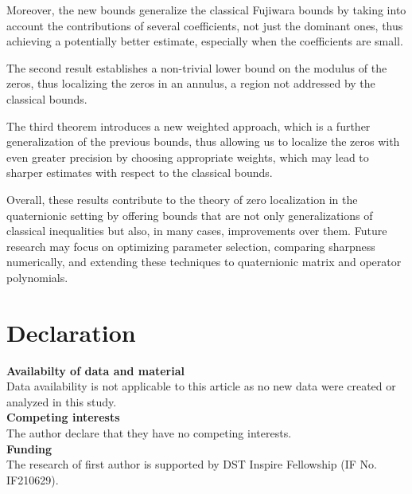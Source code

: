 \documentclass [12pt]{article}
\begin{document}
Moreover, the new bounds generalize the classical Fujiwara bounds by taking into account the contributions of several coefficients, not just the dominant ones, thus achieving a potentially better estimate, especially when the coefficients are small.

The second result establishes a non-trivial lower bound on the modulus of the zeros, thus localizing the zeros in an annulus, a region not addressed by the classical bounds.

The third theorem introduces a new weighted approach, which is a further generalization of the previous bounds, thus allowing us to localize the zeros with even greater precision by choosing appropriate weights, which may lead to sharper estimates with respect to the classical bounds.

Overall, these results contribute to the theory of zero localization in the quaternionic setting by offering bounds that are not only generalizations of classical inequalities but also, in many cases, improvements over them. Future research may focus on optimizing parameter selection, comparing sharpness numerically, and extending these techniques to quaternionic matrix and operator polynomials.
\section{Declaration}
\textbf{Availabilty of data and material}\\
 Data availability is not applicable to this article as no new data were created or analyzed in this study.\\

\noindent \textbf{Competing interests}\\
The author declare that they have no competing interests.\\

\noindent \textbf{Funding}\\
The research of first author is supported by DST Inspire Fellowship (IF No. IF210629).
\end{document}
